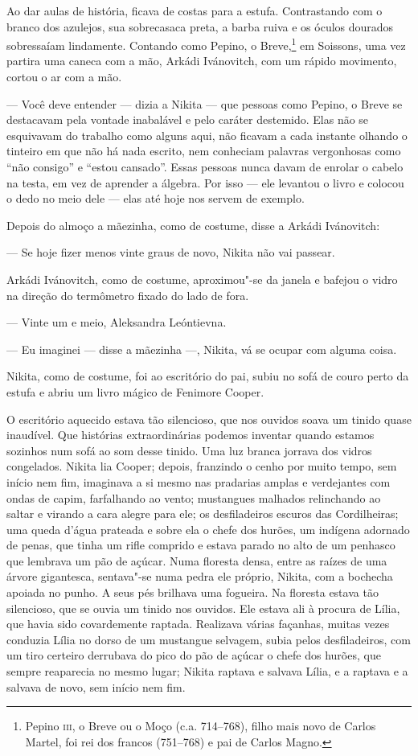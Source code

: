 Ao dar aulas de história, ficava de costas para a estufa. Contrastando
com o branco dos azulejos, sua sobrecasaca preta, a barba ruiva e os
óculos dourados sobressaíam lindamente. Contando como Pepino, o
Breve,\footnote{Pepino \textsc{iii}, o Breve ou o Moço (c.a. 714--768), filho
  mais novo de Carlos Martel, foi rei dos francos (751--768) e pai de
  Carlos Magno.} em Soissons, uma vez partira uma caneca com a mão,
Arkádi Ivánovitch, com um rápido movimento, cortou o ar com a mão.

--- Você deve entender --- dizia a Nikita --- que pessoas como Pepino, o
Breve se destacavam pela vontade inabalável e pelo caráter destemido.
Elas não se esquivavam do trabalho como alguns aqui, não ficavam a cada
instante olhando o tinteiro em que não há nada escrito, nem conheciam
palavras vergonhosas como ``não consigo'' e ``estou cansado''. Essas
pessoas nunca davam de enrolar o cabelo na testa, em vez de aprender a
álgebra. Por isso --- ele levantou o livro e colocou o dedo no meio dele
--- elas até hoje nos servem de exemplo.

Depois do almoço a mãezinha, como de costume, disse a Arkádi Ivánovitch:

--- Se hoje fizer menos vinte graus de novo, Nikita não vai passear.

Arkádi Ivánovitch, como de costume, aproximou"-se da janela e bafejou o
vidro na direção do termômetro fixado do lado de fora.

--- Vinte um e meio, Aleksandra Leóntievna.

--- Eu imaginei --- disse a mãezinha ---, Nikita, vá se ocupar com
alguma coisa.

Nikita, como de costume, foi ao escritório do pai, subiu no sofá de couro perto da estufa e abriu um livro mágico de Fenimore Cooper.

O escritório aquecido estava tão silencioso, que nos ouvidos soava um
tinido quase inaudível. Que histórias extraordinárias podemos inventar
quando estamos sozinhos num sofá ao som desse tinido. Uma luz branca
jorrava dos vidros congelados. Nikita lia Cooper; depois, franzindo o
cenho por muito tempo, sem início nem fim, imaginava a si mesmo nas
pradarias amplas e verdejantes com ondas de capim, farfalhando ao vento;
mustangues malhados relinchando ao saltar e virando a cara alegre para
ele; os desfiladeiros escuros das Cordilheiras; uma queda d'água
prateada e sobre ela o chefe dos hurões, um indígena adornado de penas,
que tinha um rifle comprido e estava parado no alto de um penhasco que
lembrava um pão de açúcar. Numa floresta densa, entre as raízes de uma
árvore gigantesca, sentava"-se numa pedra ele próprio, Nikita, com a
bochecha apoiada no punho. A seus pés brilhava uma fogueira. Na floresta
estava tão silencioso, que se ouvia um tinido nos ouvidos. Ele estava ali
à procura de Lília, que havia sido covardemente raptada. Realizava
várias façanhas, muitas vezes conduzia Lília no dorso de um mustangue
selvagem, subia pelos desfiladeiros, com um tiro certeiro derrubava do
pico do pão de açúcar o chefe dos hurões, que sempre reaparecia no mesmo
lugar; Nikita raptava e salvava Lília, e a raptava e a salvava de novo,
sem início nem fim.

